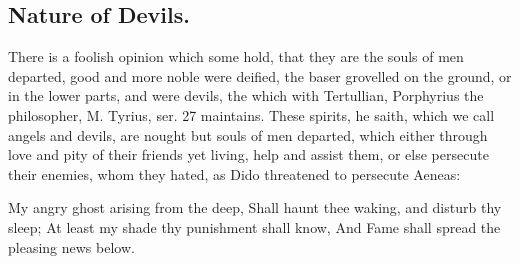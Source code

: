 {{\subsection{Nature of Devils.}
There is a foolish opinion which some hold, that
they are the souls of men departed, good and more noble were deified,
the baser grovelled on the ground, or in the lower parts, and were
devils, the which with Tertullian, Porphyrius the philosopher, M.
Tyrius, ser. 27 maintains. These spirits, he saith, which we call
angels and devils, are nought but souls of men departed, which either
through love and pity of their friends yet living, help and assist
them, or else persecute their enemies, whom they hated, as Dido
threatened to persecute Aeneas:

My angry ghost arising from the deep,
Shall haunt thee waking, and disturb thy sleep;
At least my shade thy punishment shall know,
And Fame shall spread the pleasing news below.

}}
